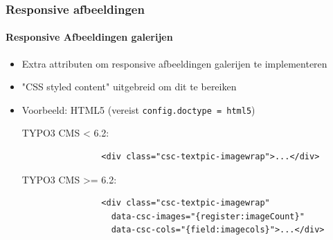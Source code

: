 \begin{frame}[fragile]
	\frametitle{Responsive afbeeldingen}
	\framesubtitle{Responsive Afbeeldingen galerijen}

	\begin{itemize}
		\item Extra attributen om responsive afbeeldingen galerijen te implementeren
		\item "CSS styled content" uitgebreid om dit te bereiken
		\item Voorbeeld: HTML5 (vereist \texttt{config.doctype = html5})\newline

			TYPO3 CMS < 6.2:


			\begin{lstlisting}
				<div class="csc-textpic-imagewrap">...</div>
			\end{lstlisting}

			TYPO3 CMS >= 6.2:

			\begin{lstlisting}
				<div class="csc-textpic-imagewrap"
				  data-csc-images="{register:imageCount}"
				  data-csc-cols="{field:imagecols}">...</div>
			\end{lstlisting}

	\end{itemize}

\end{frame}


